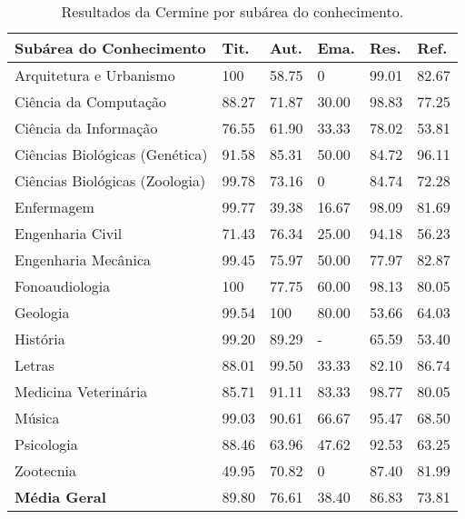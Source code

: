 \begin{table}
    \caption{Resultados da Cermine por subárea do conhecimento.}
    \begin{center}
        \begin{tabular}{|p{6cm}|C{1.2cm}|C{1.2cm}|C{1.2cm}|C{1.2cm}|C{1.2cm}|}
            \hline 
            \textbf{Subárea do Conhecimento} & \textbf{Tit.} & \textbf{Aut.} & \textbf{Ema.} & \textbf{Res.} & \textbf{Ref.} \\ \hline 
            Arquitetura e Urbanismo & 100 & 58.75 & 0 & 99.01 & 82.67 \\ \hline  
            Ciência da Computação & 88.27 & 71.87 & 30.00 & 98.83 & 77.25 \\ \hline  
            Ciência da Informação & 76.55 & 61.90 & 33.33 & 78.02 & 53.81 \\ \hline  
            Ciências Biológicas (Genética) & 91.58 & 85.31 & 50.00 & 84.72 & 96.11 \\ \hline  
            Ciências Biológicas (Zoologia) & 99.78 & 73.16 & 0 & 84.74 & 72.28 \\ \hline  
            Enfermagem & 99.77 & 39.38 & 16.67 & 98.09 & 81.69 \\ \hline  
            Engenharia Civil & 71.43 & 76.34 & 25.00 & 94.18 & 56.23 \\ \hline  
            Engenharia Mecânica & 99.45 & 75.97 & 50.00 & 77.97 & 82.87 \\ \hline  
            Fonoaudiologia & 100 & 77.75 & 60.00 & 98.13 & 80.05 \\ \hline  
            Geologia & 99.54 & 100 & 80.00 & 53.66 & 64.03 \\ \hline  
            História & 99.20 & 89.29 & - & 65.59 & 53.40 \\ \hline  
            Letras & 88.01 & 99.50 & 33.33 & 82.10 & 86.74 \\ \hline  
            Medicina Veterinária & 85.71 & 91.11 & 83.33 & 98.77 & 80.05 \\ \hline  
            Música & 99.03 & 90.61 & 66.67 & 95.47 & 68.50 \\ \hline  
            Psicologia & 88.46 & 63.96 & 47.62 & 92.53 & 63.25 \\ \hline  
            Zootecnia & 49.95 & 70.82 & 0 & 87.40 & 81.99 \\ \hline  
            \textbf{Média Geral} & 89.80 & 76.61 & 38.40 & 86.83 & 73.81 \\ \hline
        \end{tabular}
    \end{center}
    \label{tab:results-cermine}
\end{table}

